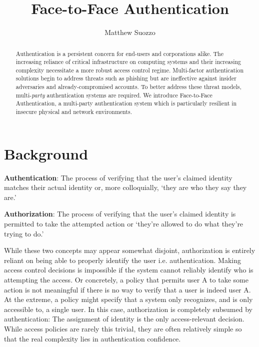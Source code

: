 \documentclass[letterpaper, 10 pt, conference]{ieeeconf}
\title{\LARGE \bf
Face-to-Face Authentication
}
\author{Matthew Suozzo}
\begin{document}
\maketitle
\thispagestyle{empty}
\pagestyle{empty}

\begin{abstract}

Authentication is a persistent concern for end-users and corporations alike.
The increasing reliance of critical infrastructure on computing systems and their increasing complexity necessitate a more robust access control regime.
Multi-factor authentication solutions begin to address threats such as phishing but are ineffective against insider adversaries and already-compromised accounts.
To better address these threat models, multi-\emph{party} authentication systems are required.
We introduce Face-to-Face Authentication, a multi-party authentication system which is particularly resilient in insecure physical and network environments.

\end{abstract}

\section{Background}

  \textbf{Authentication}: The process of verifying that the user's claimed identity matches their actual identity or, more colloquially, `they are who they say they are.'

  \textbf{Authorization}: The process of verifying that the user's claimed identity is permitted to take the attempted action or `they're allowed to do what they're trying to do.'

  While these two concepts may appear somewhat disjoint, authorization is entirely reliant on being able to properly identify the user i.e. authentication.
  Making access control decisions is impossible if the system cannot reliably identify who is attempting the access.
  Or concretely, a policy that permits user A to take some action is not meaningful if there is no way to verify that a user is indeed user A.
  At the extreme, a policy might specify that a system only recognizes, and is only accessible to, a single user.
  In this case, authorization is completely subsumed by authentication: The assignment of identity is the only access-relevant decision.
  While access policies are rarely this trivial, they are often relatively simple so that the real complexity lies in authentication confidence.
\end{document}
